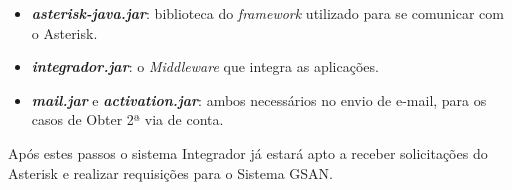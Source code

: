 \begin{itemize}
	\item \textbf{\textit{asterisk-java.jar}}: biblioteca do \textit{framework} utilizado para se comunicar com o Asterisk.
	\item \textbf{\textit{integrador.jar}}: o \textit{Middleware} que integra as aplicações.
	\item \textbf{\textit{mail.jar}} e \textbf{\textit{activation.jar}}: ambos necessários no envio de e-mail, para os casos de Obter 2ª via de conta.	
\end{itemize}

Após estes passos o sistema Integrador já estará apto a receber solicitações do Asterisk e realizar requisições para o Sistema GSAN.